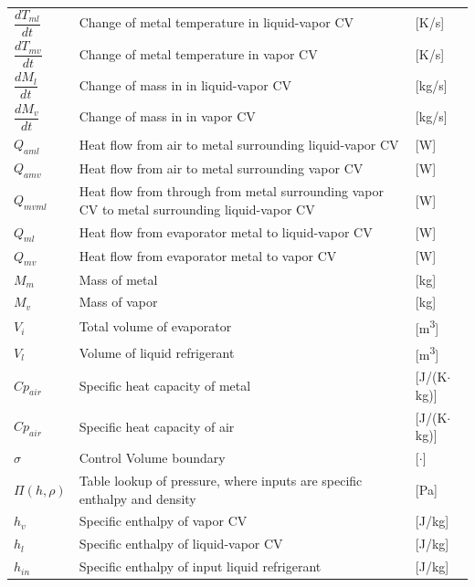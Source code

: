 \begin{center}
	\begin{tabular}{l p{10cm} l}
		$\dfrac{d T_{ml}}{dt} $		& Change of metal temperature in liquid-vapor CV  			& [\si{K}/\si{s}] \\[0.3cm]
		$\dfrac{d T_{mv}}{dt} $		& Change of metal temperature in vapor CV					& [\si{K}/\si{s}] \\[0.3cm]
		$\dfrac{d M_{l}}{dt} $		& Change of mass in	in liquid-vapor CV 						& [\si{kg}/\si{s}] \\[0.3cm]
		$\dfrac{d M_{v}}{dt} $		& Change of mass in	in vapor CV								& [\si{kg}/\si{s}] \\[0.3cm]
		$Q_{aml}$					& Heat flow from air to metal surrounding liquid-vapor CV	& [\si{W}] \\
		$Q_{amv}$					& Heat flow from air to metal surrounding vapor CV			& [\si{W}] \\
		$Q_{mvml}$					& Heat flow from through from metal surrounding vapor CV to metal surrounding liquid-vapor CV			& [\si{W}] \\
		$Q_{ml}$					& Heat flow from evaporator metal to liquid-vapor CV		& [\si{W}] \\
		$Q_{mv}$					& Heat flow from evaporator metal to vapor CV				& [\si{W}] \\
		$M_{m} $					& Mass of metal												& [\si{kg}] \\
		$M_{v} $					& Mass of vapor												& [\si{kg}] \\
		$V_{i} $					& Total volume of evaporator								& [\si{m^3}] \\
		$V_{l} $					& Volume of liquid refrigerant								& [\si{m^3}] \\
		$Cp_{air}$					& Specific heat capacity of metal							& [\si{J}/(\si{K}$ \cdot $\si{kg})] \\
		$Cp_{air}$					& Specific heat capacity of air								& [\si{J}/(\si{K}$ \cdot $\si{kg})] \\
		$\sigma$					& Control Volume boundary 									& [$\cdot$] \\
		$\Pi(h,\rho) $						& Table lookup of pressure, where inputs are specific enthalpy and density								& [\si{Pa}] \\
		$h_{v} $					& Specific enthalpy of vapor CV								& [\si{J}/\si{kg}] \\
		$h_{l} $					& Specific enthalpy of liquid-vapor CV						& [\si{J}/\si{kg}] \\
		$h_{in} $					& Specific enthalpy of input liquid refrigerant 			& [\si{J}/\si{kg}] \\

\end{tabular}
\end{center}
